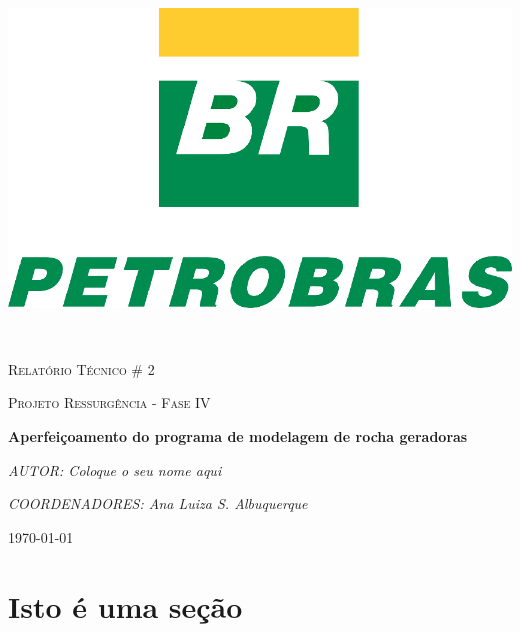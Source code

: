 \documentclass[11pt]{article}
\begin{document}
\begin{titlepage}
\begin{minipage}[b]{0.3\textwidth}
\end{minipage}%
\hfill %
\begin{minipage}[b]{0.3\textwidth}
  \flushright
  \includegraphics[width=\textwidth]{figures/petrobras.png} %
\end{minipage}
\\
\vspace{2cm}
{\scshape\Huge \textcolor{navyblue}{Relatório Técnico \# 2} \par} %
\vspace{1cm}
{\scshape\Large \textcolor{navyblue}{Projeto Ressurgência - Fase IV}\par} %
\vspace{1.5cm}
{\huge\bfseries \textcolor{navyblue}{Aperfeiçoamento do programa de modelagem de rocha geradoras }\par}
\vspace{2cm}
{\Large\itshape \textcolor{navyblue}{AUTOR: Coloque o seu nome aqui}\par}
\vspace{2cm}
{\Large\itshape \textcolor{navyblue}{COORDENADORES: Ana Luiza S. Albuquerque}\par}
\vfill
{\large \textcolor{navyblue}{\today}\par}




\end{titlepage}



\section{Isto é uma seção}
\end{document}
